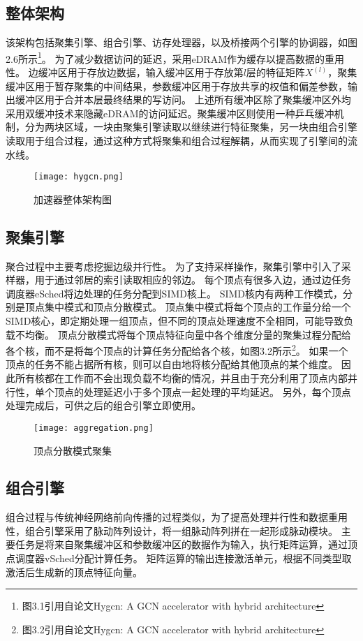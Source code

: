 \subsection{整体架构}
该架构包括聚集引擎、组合引擎、访存处理器，以及桥接两个引擎的协调器，如图2.6所示\footnote{图3.1引用自论文Hygcn: A GCN accelerator with hybrid architec­ture}。
为了减少数据访问的延迟，采用eDRAM作为缓存以提高数据的重用性。
边缓冲区用于存放边数据，输入缓冲区用于存放第$l$层的特征矩阵$X^{(l)}$，聚集缓冲区用于暂存聚集的中间结果，参数缓冲区用于存放共享的权值和偏差参数，输出缓冲区用于合并本层最终结果的写访问。
上述所有缓冲区除了聚集缓冲区外均采用双缓冲技术来隐藏eDRAM的访问延迟。聚集缓冲区则使用一种乒乓缓冲机制，分为两块区域，一块由聚集引擎读取以继续进行特征聚集，另一块由组合引擎读取用于组合过程，通过这种方式将聚集和组合过程解耦，从而实现了引擎间的流水线。

\begin{figure}[htb]
    \centering
    \texttt{[image: hygcn.png]}
    \caption{加速器整体架构图}
\end{figure}

\subsection{聚集引擎}
聚合过程中主要考虑挖掘边级并行性。
为了支持采样操作，聚集引擎中引入了采样器，用于通过邻居的索引读取相应的邻边。
每个顶点有很多入边，通过边任务调度器eSched将边处理的任务分配到SIMD核上。
SIMD核内有两种工作模式，分别是顶点集中模式和顶点分散模式。
顶点集中模式将每个顶点的工作量分给一个SIMD核心，即定期处理一组顶点，但不同的顶点处理速度不全相同，可能导致负载不均衡。
顶点分散模式将每个顶点特征向量中各个维度分量的聚集过程分配给各个核，而不是将每个顶点的计算任务分配给各个核，如图3.2所示\footnote{图3.2引用自论文Hygcn: A GCN accelerator with hybrid architec­ture}。
如果一个顶点的任务不能占据所有核，则可以自由地将核分配给其他顶点的某个维度。
因此所有核都在工作而不会出现负载不均衡的情况，并且由于充分利用了顶点内部并行性，单个顶点的处理延迟小于多个顶点一起处理的平均延迟。
另外，每个顶点处理完成后，可供之后的组合引擎立即使用。

\begin{figure}[htb]
    \centering
    \texttt{[image: aggregation.png]}
    \caption{顶点分散模式聚集}
\end{figure}

\subsection{组合引擎}
组合过程与传统神经网络前向传播的过程类似，为了提高处理并行性和数据重用性，组合引擎采用了脉动阵列设计，将一组脉动阵列拼在一起形成脉动模块。
主要任务是将来自聚集缓冲区和参数缓冲区的数据作为输入，执行矩阵运算，通过顶点调度器vSched分配计算任务。
矩阵运算的输出连接激活单元，根据不同类型取激活后生成新的顶点特征向量。

